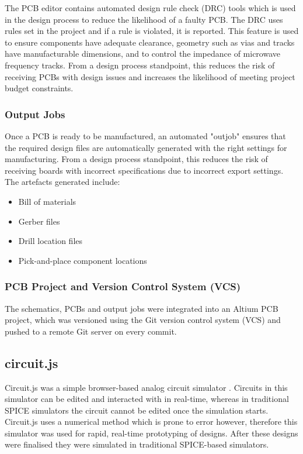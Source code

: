 \documentclass{report}
\begin{document}
The PCB editor contains automated design rule check (DRC) tools which is used in the design process to reduce the likelihood of a faulty PCB. The DRC uses rules set in the project and if a rule is violated, it is reported.
This feature is used to ensure components have adequate clearance, geometry such as vias and tracks have manufacturable dimensions, and to control the impedance of microwave frequency tracks.
From a design process standpoint, this reduces the risk of receiving PCBs with design issues and increases the likelihood of meeting project budget constraints.


\subsubsection{Output Jobs}
\label{sec:output-jobs}
Once a PCB is ready to be manufactured, an automated "outjob" ensures that the required design files are automatically generated with the right settings for manufacturing. From a design process standpoint, this reduces the risk of receiving boards with incorrect specifications due to incorrect export settings.
The artefacts generated include:
\begin{itemize}
  \item Bill of materials
  \item Gerber files
  \item Drill location files
  \item Pick-and-place component locations
\end{itemize}

\subsubsection{PCB Project and Version Control System (VCS)}

The schematics, PCBs and output jobs were integrated into an Altium PCB project, which was versioned using the Git version control system (VCS) and pushed to a remote Git server on every commit.

\subsection{circuit.js}

Circuit.js was a simple browser-based analog circuit simulator \cite{falstad22falstad}. Circuits in this simulator can be edited and interacted with in real-time, whereas in traditional SPICE simulators the circuit cannot be edited once the simulation starts. Circuit.js uses a numerical method which is prone to error however, therefore this simulator was used for rapid, real-time prototyping of designs. After these designs were finalised they were simulated in traditional SPICE-based simulators.
\end{document}
